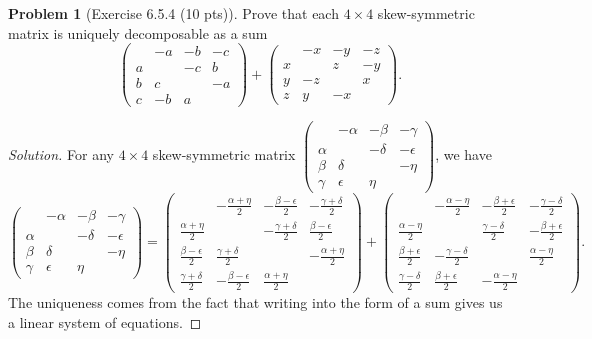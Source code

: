 \documentclass{article}
\theoremstyle{definition}
\newtheorem{problem}{Problem}
\theoremstyle{plain}
\begin{document}
\begin{problem}[Exercise 6.5.4 (10 pts)]
Prove that each $4\times4$ skew-symmetric matrix is uniquely decomposable as a sum
\begin{displaymath}
\begin{pmatrix}&-a&-b&-c\\ a&&-c&b\\ b&c&&-a\\ c&-b&a&\end{pmatrix}+\begin{pmatrix}&-x&-y&-z\\ x&&z&-y\\ y&-z&&x\\ z&y&-x&\end{pmatrix}.
\end{displaymath}
\end{problem}
\begin{adjustwidth}{0.7cm}{}
\color{blue}
\begin{proof}[Solution]
For any $4\times4$ skew-symmetric matrix $\begin{pmatrix}&-\alpha&-\beta&-\gamma\\ \alpha&&-\delta&-\epsilon\\ \beta&\delta&&-\eta\\ \gamma&\epsilon&\eta&\end{pmatrix}$, we have
\begin{equation}\label{map}
\begin{pmatrix}&-\alpha&-\beta&-\gamma\\ \alpha&&-\delta&-\epsilon\\ \beta&\delta&&-\eta\\ \gamma&\epsilon&\eta&\end{pmatrix}=\begin{pmatrix}&-\frac{\alpha+\eta}{2}&-\frac{\beta-\epsilon}{2}&-\frac{\gamma+\delta}{2}\\ \frac{\alpha+\eta}{2}&&-\frac{\gamma+\delta}{2}&\frac{\beta-\epsilon}{2}\\ \frac{\beta-\epsilon}{2}&\frac{\gamma+\delta}{2}&&-\frac{\alpha+\eta}{2}\\ \frac{\gamma+\delta}{2}&-\frac{\beta-\epsilon}{2}&\frac{\alpha+\eta}{2}&\end{pmatrix}+\begin{pmatrix}&-\frac{\alpha-\eta}{2}&-\frac{\beta+\epsilon}{2}&-\frac{\gamma-\delta}{2}\\ \frac{\alpha-\eta}{2}&&\frac{\gamma-\delta}{2}&-\frac{\beta+\epsilon}{2}\\ \frac{\beta+\epsilon}{2}&-\frac{\gamma-\delta}{2}&&\frac{\alpha-\eta}{2}\\ \frac{\gamma-\delta}{2}&\frac{\beta+\epsilon}{2}&-\frac{\alpha-\eta}{2}&\end{pmatrix}.
\end{equation}
The uniqueness comes from the fact that writing into the form of a sum gives us a linear system of equations.
\color{black}
\end{proof}
\end{adjustwidth}
\end{document}
